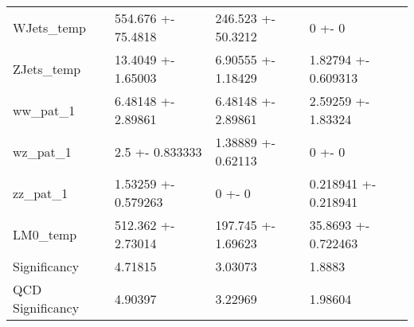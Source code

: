 \documentclass[11pt]{amsart}
\begin{document}
\begin{landscape}
\begin{table}[hbtp]
\begin{tabular}{llll }
\small WJets_temp & \small   554.676 +- 75.4818 & \small   246.523 +- 50.3212 & \small   0 +- 0\\
\small ZJets_temp & \small   13.4049 +- 1.65003 & \small   6.90555 +- 1.18429 & \small   1.82794 +- 0.609313\\
\small ww_pat_1 & \small   6.48148 +- 2.89861 & \small   6.48148 +- 2.89861 & \small   2.59259 +- 1.83324\\
\small wz_pat_1 & \small 2.5 +- 0.833333 & \small   1.38889 +- 0.62113 & \small   0 +- 0\\
\small zz_pat_1 & \small   1.53259 +- 0.579263 & \small   0 +- 0 & \small  0.218941 +- 0.218941\\
\small LM0_temp & \small   512.362 +- 2.73014 & \small   197.745 +- 1.69623 & \small   35.8693 +- 0.722463\\
\small Significancy & \small   4.71815 & \small   3.03073 & \small 1.8883\\
\small QCD Significancy & \small   4.90397 & \small   3.22969 & \small   1.98604\\


   \end{tabular}

   \label{tab:booktabs}
\end{table}
\end{landscape}
\end{document}
